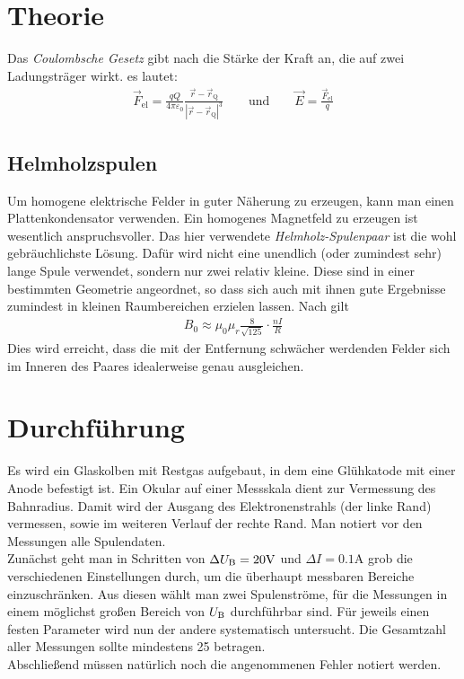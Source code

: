 \documentclass[12pt,a4paper,titlepage,headinclude,bibtotoc]{scrartcl}
\begin{document}
\section{Theorie}
\label{sec:theorie}
Das \emph{Coulombsche Gesetz} gibt nach \cite[S. 2]{demtroeder2} die Stärke der Kraft an, die auf zwei Ladungsträger wirkt.
es lautet:
\begin{align*}
	\vec F_\text{el}=\frac{qQ}{4\pi\varepsilon_0}\frac{\vec r-\vec r_\text{Q}}{|\vec r-\vec r_\text{Q}|^3}\qquad\text{und}\qquad\vec E =\frac{\vec F_\text{el}}{q}
\end{align*}


\subsection{Helmholzspulen}
Um homogene elektrische Felder in guter Näherung zu erzeugen, kann man einen Plattenkondensator verwenden.
Ein homogenes Magnetfeld zu erzeugen ist wesentlich anspruchsvoller. 
Das hier verwendete \emph{Helmholz-Spulenpaar} ist die wohl gebräuchlichste Lösung.
Dafür wird nicht eine unendlich (oder zumindest sehr) lange Spule verwendet, sondern nur zwei relativ kleine.
Diese sind in einer bestimmten Geometrie angeordnet, so dass sich auch mit ihnen gute Ergebnisse zumindest in kleinen Raumbereichen erzielen lassen.
Nach \cite[S. 94]{demtroeder2} gilt
\begin{align*}
	B_0\approx\mu_0\mu_r\frac{8}{\sqrt {125}}\cdot\frac{nI}{R}
\end{align*}
Dies wird erreicht, dass die mit der Entfernung schwächer werdenden Felder sich im Inneren des Paares idealerweise genau ausgleichen.

\section{Durchführung}
\label{sec:durchfuehrung}
Es wird ein Glaskolben mit Restgas aufgebaut, in dem eine Glühkatode mit einer Anode befestigt ist.
Ein Okular auf einer Messskala dient zur Vermessung des Bahnradius.
Damit wird der Ausgang des Elektronenstrahls (der linke Rand) vermessen, sowie im weiteren Verlauf der rechte Rand.
Man notiert vor den Messungen alle Spulendaten.\\
Zunächst geht man in Schritten von $\Delta U_\text B=20\si{\volt}$ und $\Delta I=0.1\si{\ampere}$ grob die verschiedenen Einstellungen durch, um die überhaupt messbaren Bereiche einzuschränken.
Aus diesen wählt man zwei Spulenströme, für die Messungen in einem möglichst großen Bereich von $U_\text B$ durchführbar sind.
Für jeweils einen festen Parameter wird nun der andere systematisch untersucht.
Die Gesamtzahl aller Messungen sollte mindestens 25 betragen.\\
Abschließend müssen natürlich noch die angenommenen Fehler notiert werden.
\end{document}
